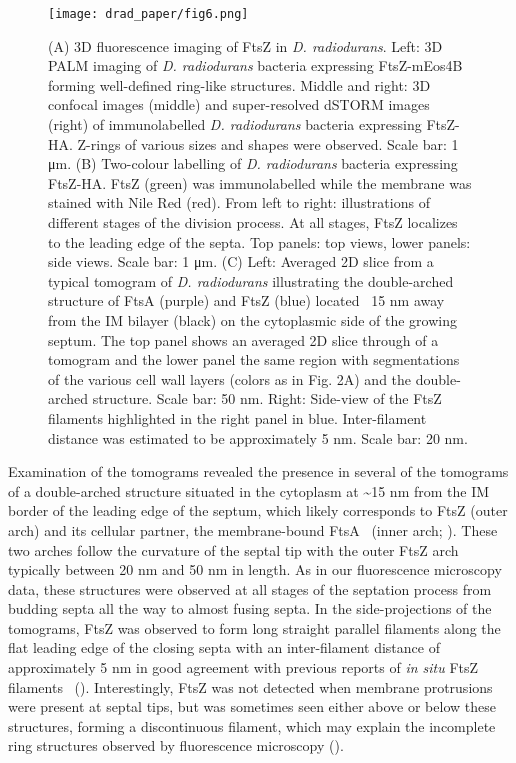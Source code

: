 \begin{figure}
    \centering
    \texttt{[image: drad\_paper/fig6.png]}
    \label{drad_fig6}
\end{figure}
\begin{figure}
    \ContinuedFloat
    \caption[]{(A) 3D fluorescence imaging of FtsZ in \textit{D. radiodurans}. Left: 3D PALM imaging of \textit{D. radiodurans} bacteria expressing FtsZ-mEos4B forming well-defined ring-like structures. Middle and right: 3D confocal images (middle) and super-resolved dSTORM images (right) of immunolabelled \textit{D. radiodurans} bacteria expressing FtsZ-HA. Z-rings of various sizes and shapes were observed. Scale bar: 1 μm. (B) Two-colour labelling of \textit{D. radiodurans} bacteria expressing FtsZ-HA. FtsZ (green) was immunolabelled while the membrane was stained with Nile Red (red). From left to right: illustrations of different stages of the division process. At all stages, FtsZ localizes to the leading edge of the septa. Top panels: top views, lower panels: side views. Scale bar: 1 μm. (C) Left: Averaged 2D slice from a typical tomogram of \textit{D. radiodurans} illustrating the double-arched structure of FtsA (purple) and FtsZ (blue) located ~15 nm away from the IM bilayer (black) on the cytoplasmic side of the growing septum. The top panel shows an averaged 2D slice through of a tomogram and the lower panel the same region with segmentations of the various cell wall layers (colors as in Fig. 2A) and the double-arched structure. Scale bar: 50 nm. Right: Side-view of the FtsZ filaments highlighted in the right panel in blue. Inter-filament distance was estimated to be approximately 5 nm. Scale bar: 20 nm.}
\end{figure}

Examination of the tomograms revealed the presence in several of the tomograms of a double-arched structure situated in the cytoplasm at \sim15 nm from the IM border of the leading edge of the septum, which likely corresponds to FtsZ (outer arch) and its cellular partner, the membrane-bound FtsA~\cite{sextonSuperresolutionConfocalCryoCLEM2022} (inner arch; ).
These two arches follow the curvature of the septal tip with the outer FtsZ arch typically between 20 nm and 50 nm in length.
As in our fluorescence microscopy data, these structures were observed at all stages of the septation process from budding septa all the way to almost fusing septa.
In the side-projections of the tomograms, FtsZ was observed to form long straight parallel filaments along the flat leading edge of the closing septa with an inter-filament distance of approximately 5 nm in good agreement with previous reports of \textit{in situ} FtsZ filaments~\cite{liStructureFtsZFilaments2007,szwedziakArchitectureRingFormed2014} ().
Interestingly, FtsZ was not detected when membrane protrusions were present at septal tips, but was sometimes seen either above or below these structures, forming a discontinuous filament, which may explain the incomplete ring structures observed by fluorescence microscopy ().


